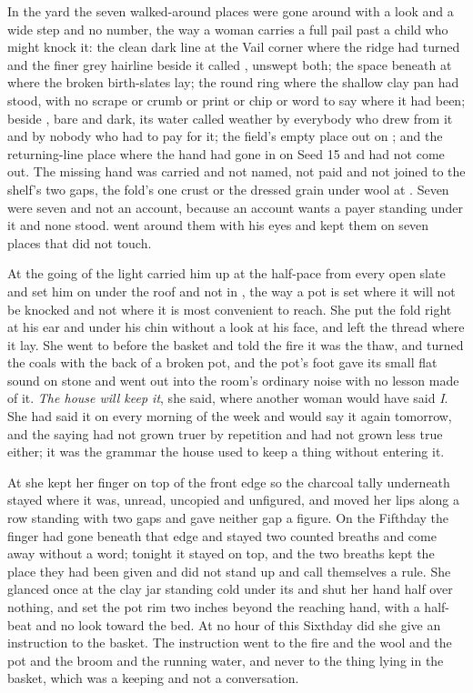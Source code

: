 In the yard the seven walked-around places were gone around with a look and a wide step and no number, the way a woman carries a full pail past a child who might knock it: the clean dark line at the Vail corner where the  ridge had turned and the finer grey hairline beside it called , unswept both; the space beneath  at  where the broken birth-slates lay; the round ring where the shallow clay pan had stood, with no scrape or crumb or print or chip or word to say where it had been;  beside , bare and dark, its water called weather by everybody who drew from it and by nobody who had to pay for it; the field's empty place out on ; and the returning-line place where the hand had gone in on Seed 15 and had not come out. The missing hand was carried and not named, not paid and not joined to the shelf's two gaps, the fold's one crust or the dressed grain under wool at . Seven were seven and not an account, because an account wants a payer standing under it and none stood.  went around them with his eyes and kept them on seven places that did not touch.

\scenebreak

At the going of the light  carried him up at the half-pace from every open slate and set him on  under the roof and not in , the way a pot is set where it will not be knocked and not where it is most convenient to reach. She put the fold right at his ear and under his chin without a look at his face, and left the thread where it lay. She went to  before the basket and told the fire it was the thaw, and turned the coals with the back of a broken pot, and the pot's foot gave its small flat sound on stone and went out into the room's ordinary noise with no lesson made of it. \emph{The house will keep it}, she said, where another woman would have said \emph{I}. She had said it on every morning of the week and would say it again tomorrow, and the saying had not grown truer by repetition and had not grown less true either; it was the grammar the house used to keep a thing without entering it.

At  she kept her finger on top of the front edge so the charcoal tally underneath stayed where it was, unread, uncopied and unfigured, and moved her lips along a row standing with two gaps and gave neither gap a figure. On the Fifthday the finger had gone beneath that edge and stayed two counted breaths and come away without a word; tonight it stayed on top, and the two breaths kept the place they had been given and did not stand up and call themselves a rule. She glanced once at the clay jar standing cold under its  and shut her hand half over nothing, and set the pot rim two inches beyond the reaching hand, with a half-beat and no look toward the bed. At no hour of this Sixthday did she give an instruction to the basket. The instruction went to the fire and the wool and the pot and the broom and the running water, and never to the thing lying in the basket, which was a keeping and not a conversation.

